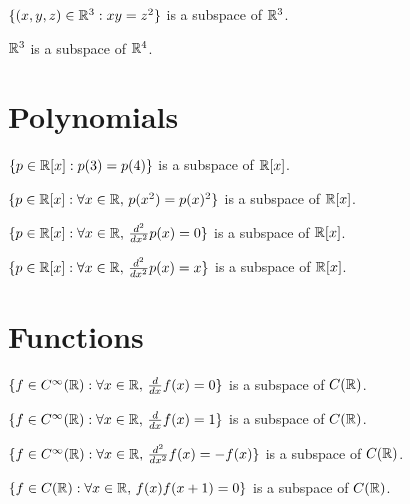 \documentclass{homework}
\begin{document}
\begin{truefalse}
  $\{ (x,y,z) \in \mathbb{R}^3 : xy = z^2 \}$ is a subspace of $\mathbb{R}^3$.
\end{truefalse}

\begin{truefalse}
  $\mathbb{R}^3$ is a subspace of $\mathbb{R}^4$.
\end{truefalse}

\section{Polynomials}

\begin{truefalse}
  $\{ p \in \mathbb{R}[x] : p(3) = p(4) \}$ is a subspace of $\mathbb{R}[x]$.
\end{truefalse}

\begin{truefalse}
  $\{ p \in \mathbb{R}[x] : \forall x \in \mathbb{R},\, p(x^2) = p(x)^2 \}$ is a subspace of $\mathbb{R}[x]$.
\end{truefalse}

\begin{truefalse}
  $\{ p \in \mathbb{R}[x] : \forall x \in \mathbb{R},\, \frac{d^2}{dx^2} p(x) = 0 \}$ is a subspace of $\mathbb{R}[x]$.
\end{truefalse}

\begin{truefalse}
  $\{ p \in \mathbb{R}[x] : \forall x \in \mathbb{R},\, \frac{d^2}{dx^2} p(x) = x \}$ is a subspace of $\mathbb{R}[x]$.
\end{truefalse}

\section{Functions}

\begin{truefalse}
  $\{ f \in C^\infty(\mathbb{R}) : \forall x \in \mathbb{R},\, \frac{d}{dx} f(x) = 0 \}$ is a subspace of $C(\mathbb{R})$.
\end{truefalse}

\begin{truefalse}
  $\{ f \in C^\infty(\mathbb{R}) : \forall x \in \mathbb{R},\, \frac{d}{dx} f(x) = 1 \}$ is a subspace of $C(\mathbb{R})$.
\end{truefalse}

\begin{truefalse}
  $\{ f \in C^\infty(\mathbb{R}) : \forall x \in \mathbb{R},\, \frac{d^2}{dx^2} f(x) = -f(x) \}$ is a subspace of $C(\mathbb{R})$.
\end{truefalse}

\begin{truefalse}
  $\{ f \in C(\mathbb{R}) : \forall x \in \mathbb{R},\, f(x) f(x+1) = 0 \}$ is a subspace of $C(\mathbb{R})$.
\end{truefalse}
\end{document}
